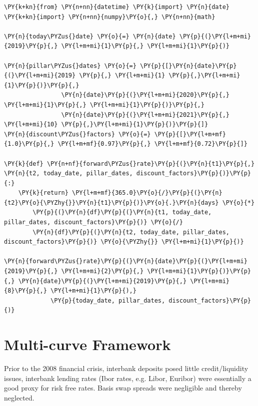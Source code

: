 \begin{tcolorbox}[breakable, size=fbox, boxrule=1pt, pad at break*=1mm,colback=cellbackground, colframe=cellborder]
\begin{Verbatim}[commandchars=\\\{\}]
\PY{k+kn}{from} \PY{n+nn}{datetime} \PY{k}{import} \PY{n}{date}
\PY{k+kn}{import} \PY{n+nn}{numpy}\PY{o}{,} \PY{n+nn}{math}

\PY{n}{today\PYZus{}date} \PY{o}{=} \PY{n}{date} \PY{p}{(}\PY{l+m+mi}{2019}\PY{p}{,} \PY{l+m+mi}{1}\PY{p}{,} \PY{l+m+mi}{1}\PY{p}{)}

\PY{n}{pillar\PYZus{}dates} \PY{o}{=} \PY{p}{[}\PY{n}{date}\PY{p}{(}\PY{l+m+mi}{2019} \PY{p}{,} \PY{l+m+mi}{1} \PY{p}{,}\PY{l+m+mi}{1}\PY{p}{)}\PY{p}{,} 
                \PY{n}{date}\PY{p}{(}\PY{l+m+mi}{2020}\PY{p}{,} \PY{l+m+mi}{1}\PY{p}{,} \PY{l+m+mi}{1}\PY{p}{)}\PY{p}{,} 
                \PY{n}{date}\PY{p}{(}\PY{l+m+mi}{2021}\PY{p}{,} \PY{l+m+mi}{10} \PY{p}{,}\PY{l+m+mi}{1}\PY{p}{)}\PY{p}{]}
\PY{n}{discount\PYZus{}factors} \PY{o}{=} \PY{p}{[}\PY{l+m+mf}{1.0}\PY{p}{,} \PY{l+m+mf}{0.97}\PY{p}{,} \PY{l+m+mf}{0.72}\PY{p}{]}

\PY{k}{def} \PY{n+nf}{forward\PYZus{}rate}\PY{p}{(}\PY{n}{t1}\PY{p}{,} \PY{n}{t2, today_date, pillar_dates, discount_factors}\PY{p}{)}\PY{p}{:}
    \PY{k}{return} \PY{l+m+mf}{365.0}\PY{o}{/}\PY{p}{(}\PY{n}{t2}\PY{o}{\PYZhy{}}\PY{n}{t1}\PY{p}{)}\PY{o}{.}\PY{n}{days} \PY{o}{*}
        \PY{p}{(}\PY{n}{df}\PY{p}{(}\PY{n}{t1, today_date, pillar_dates, discount_factors}\PY{p}{)} \PY{o}{/}
        \PY{n}{df}\PY{p}{(}\PY{n}{t2, today_date, pillar_dates, discount_factors}\PY{p}{)} \PY{o}{\PYZhy{}} \PY{l+m+mi}{1}\PY{p}{)}

\PY{n}{forward\PYZus{}rate}\PY{p}{(}\PY{n}{date}\PY{p}{(}\PY{l+m+mi}{2019}\PY{p}{,} \PY{l+m+mi}{2}\PY{p}{,} \PY{l+m+mi}{1}\PY{p}{)}\PY{p}{,} \PY{n}{date}\PY{p}{(}\PY{l+m+mi}{2019}\PY{p}{,} \PY{l+m+mi}{8}\PY{p}{,} \PY{l+m+mi}{1}\PY{p}{),}
             \PY{p}{today_date, pillar_dates, discount_factors}\PY{p}{)}
\end{Verbatim}
\end{tcolorbox}

\section{Multi-curve Framework}
\label{sec:financial-crisis}

Prior to the 2008 financial crisis, interbank deposits posed little 
credit/liquidity issues, interbank lending rates (Ibor rates, e.g. Libor, Euribor)
were essentially a good proxy for risk free rates. 
Basis swap spreads were negligible and thereby neglected. 

